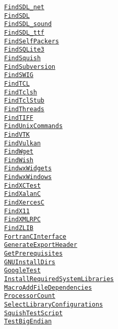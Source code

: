 \documentclass{article}
\newcommand{\cmakemodule}[1]{{\href{https://cmake.org/cmake/help/v3.20/module/#1.html}{{\lstinline{#1}}}}}
\begin{document}
\begin{minipage}[t]{0.18\linewidth}
\cmakemodule{FindSDL_net}\\
\cmakemodule{FindSDL}\\
\cmakemodule{FindSDL_sound}\\
\cmakemodule{FindSDL_ttf}\\
\cmakemodule{FindSelfPackers}\\
\cmakemodule{FindSQLite3}\\
\cmakemodule{FindSquish}\\
\cmakemodule{FindSubversion}\\
\cmakemodule{FindSWIG}\\
\cmakemodule{FindTCL}\\
\cmakemodule{FindTclsh}\\
\cmakemodule{FindTclStub}\\
\cmakemodule{FindThreads}\\
\cmakemodule{FindTIFF}\\
\cmakemodule{FindUnixCommands}\\
\cmakemodule{FindVTK}\\
\cmakemodule{FindVulkan}\\
\cmakemodule{FindWget}\\
\cmakemodule{FindWish}\\
\cmakemodule{FindwxWidgets}\\
\cmakemodule{FindwxWindows}\\
\cmakemodule{FindXCTest}\\
\cmakemodule{FindXalanC}\\
\cmakemodule{FindXercesC}\\
\cmakemodule{FindX11}\\
\cmakemodule{FindXMLRPC}\\
\cmakemodule{FindZLIB}\\
\cmakemodule{FortranCInterface}\\
\cmakemodule{GenerateExportHeader}\\
\cmakemodule{GetPrerequisites}\\
\cmakemodule{GNUInstallDirs}\\
\cmakemodule{GoogleTest}\\
\cmakemodule{InstallRequiredSystemLibraries}\\
\cmakemodule{MacroAddFileDependencies}\\
\cmakemodule{ProcessorCount}\\
\cmakemodule{SelectLibraryConfigurations}\\
\cmakemodule{SquishTestScript}\\
\cmakemodule{TestBigEndian}\\

\end{minipage}
\end{document}
